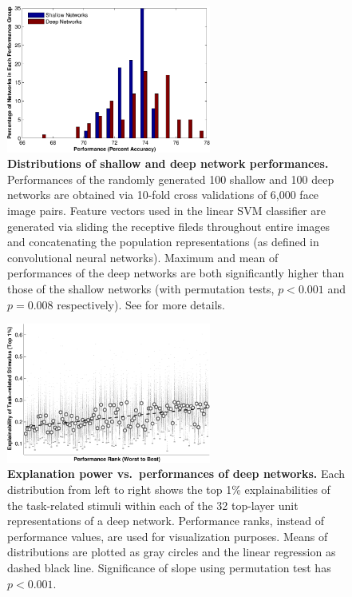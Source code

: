 
\newcommand{\beginsupplement}{\setcounter{figure}{0} \renewcommand{\thefigure}{S\arabic{figure}}}
\beginsupplement

\begin{figure}[H]
\centering \includegraphics[width=0.6\textwidth]{Figs/e_fig7s-crop.pdf} 
\caption{ 
{\bf Distributions of shallow and deep network performances.} Performances of the randomly generated 100 shallow and 100 deep networks are obtained via 10-fold cross validations of 6,000 face image pairs. Feature vectors used in the linear SVM classifier are generated via sliding the receptive fileds throughout entire images and concatenating the population representations (as defined in convolutional neural networks). Maximum and mean of performances of the deep networks are both significantly higher than those of the shallow networks (with permutation tests, $p<0.001$ and $p=0.008$ respectively). See \cite{cox2011beyond} for more details.}
\label{fig:SFpef}
\end{figure}

\begin{figure}[H]
\centering \includegraphics[width=0.6\textwidth]{Figs/e_fig4b.pdf} 
\caption{ 
{\bf Explanation power vs.~performances of deep networks.} Each distribution from left to right shows the top 1\% explainabilities of the task-related stimuli within each of the 32 top-layer unit representations of a deep network. Performance ranks, instead of performance values, are used for visualization purposes. Means of distributions are plotted as gray circles and the linear regression as dashed black line. Significance of slope using permutation test has $p < 0.001$.}
\label{fig:SFexp}
\end{figure}

